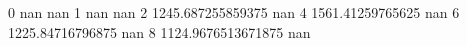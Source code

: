 0 nan nan
1 nan nan
2 1245.687255859375 nan
4 1561.41259765625 nan
6 1225.84716796875 nan
8 1124.9676513671875 nan
